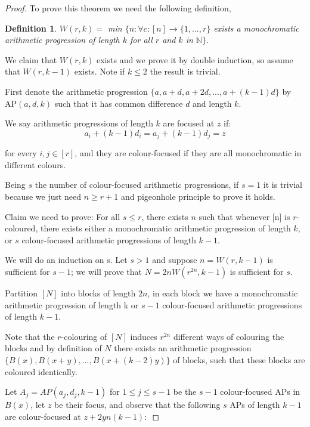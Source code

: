 \documentclass[12pt,twoside,a4paper]{book}
\numberwithin{equation}{section}
\newtheorem{definition}	[theorem] {Definition}
\theoremstyle{remark}
\begin{document}
\begin{proof}To prove this theorem we need the following definition,

\begin{definition}
$W(r,k) =$ min $\{n \colon \forall c \colon [n] \rightarrow \{1,...,r\}$ exists a monochromatic arithmetic  progression of length $k$ for all $r$ and $k$ in $\mathbb{N}\}$.
\end{definition}

We claim that $W(r,k)$ exists and we prove it by double induction, so assume that $W(r, k-1)$ exists. Note if $k \leq 2$ the result is trivial.

First denote the arithmetic progression $\{a, a + d, a +2d, ..., a+(k-1)d\}$ by AP$(a,d,k)$ such that it has common difference  $d$ and length $k$.

We say arithmetic progressions of length $k$ are focused at $z$ if:
$$ a_i +  (k-1)d_i = a_j  + (k-1) d_j = z $$

for every $i, j \in [r]$, and they are colour-focused if they are all monochromatic in different colours.

Being $s$ the number of colour-focused arithmetic progressions, if $s=1$ it is trivial because we just need $n \geq r+1$ and pigeonhole principle to prove it holds.

Claim we need to prove: For all $s \leq r$, there exists $n$ such that whenever [n] is $r$-coloured, there exists either a monochromatic arithmetic progression of length $k$, or $s$ colour-focused arithmetic progressions of length $k-1$.

We will do an induction on s. Let $s > 1$ and suppose $n=W(r,k-1)$ is sufficient for $s-1$; we will prove that $N=2n W(r^{2n},k-1)$ is sufficient for $s$.

Partition $[N]$ into blocks of length $2n$, in each block we have a monochromatic arithmetic progression of length k or $s-1$ colour-focused arithmetic progressions of length $k-1$. 

Note that the $r$-colouring of $[N]$ induces $r^{2n}$ different ways of colouring the blocks and by definition of $N$ there exists an arithmetic progression $\{B(x), B(x+y), ... , B(x+(k-2)y)\}$ of blocks, such that these blocks are coloured identically.

Let $A_j = AP(a_j, d_j, k-1)$ for $1 \leq j \leq s-1$ be the $s-1$ colour-focused APs in $B(x)$, let $z$ be their focus, and observe that the following $s$ APs of length $k-1$ are colour-focused at $z+ 2yn(k-1) \colon$


\end{proof}
\end{document}
